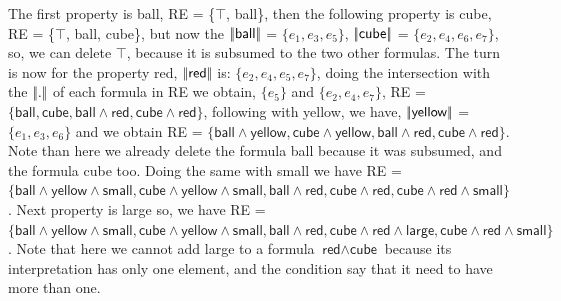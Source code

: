 The first property is \textsf{ball}, RE = \{$\top$, \textsf{ball}\}, then the following property is \textsf{cube}, RE = \{$\top$, \textsf{ball}, \textsf{cube}\}, but now the $|\!|\textsf{ball}|\!|$ = $\{e_1, e_3, e_5\}$, $|\!|\textsf{cube}|\!|$ = $\{e_2, e_4, e_6, e_7\}$, so, we can delete $\top$, because it is subsumed to the two other formulas. The turn is now for the property \textsf{red}, $|\!|\textsf{red}|\!|$ is: $\{e_2, e_4, e_5, e_7\}$, doing the intersection with the $|\!|.|\!|$ of each formula in RE we obtain, $\{e_5\}$ and $\{e_2, e_4, e_7\}$, RE = $\{\textsf{ball}, \textsf{cube}, \textsf{ball} \wedge \textsf{red}, \textsf{cube} \wedge \textsf{red}\}$, following with \textsf{yellow}, we have, $|\!|\textsf{yellow}|\!|$ = $\{e_1, e_3, e_6\}$ and we obtain RE = $\{\textsf{ball} \wedge \textsf{yellow}, \textsf{cube} \wedge \textsf{yellow}, \textsf{ball} \wedge \textsf{red}, \textsf{cube} \wedge \textsf{red}\}$. Note than here we already delete the formula \textsf{ball} because it was subsumed, and the formula \textsf{cube} too.
Doing the same with \textsf{small} we have RE = $\{\textsf{ball} \wedge \textsf{yellow} \wedge \textsf{small}, \textsf{cube} \wedge \textsf{yellow} \wedge \textsf{small}, \textsf{ball} \wedge \textsf{red}, \textsf{cube} \wedge \textsf{red}, \textsf{cube} \wedge \textsf{red} \wedge \textsf{small}\}$. Next property is \textsf{large} so, we have RE = $\{\textsf{ball} \wedge \textsf{yellow} \wedge \textsf{small}, \textsf{cube} \wedge \textsf{yellow} \wedge \textsf{small}, \textsf{ball} \wedge \textsf{red}, \textsf{cube} \wedge \textsf{red} \wedge \textsf{large}, \textsf{cube} \wedge \textsf{red} \wedge \textsf{small}\}$. Note that here we cannot add \textsf{large} to a formula $\textsf{red} \wedge \textsf{cube}$ because its interpretation has only one element, and the condition say that it need to have more than one.

